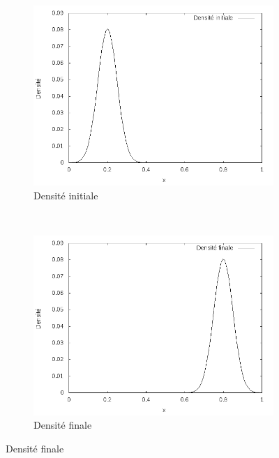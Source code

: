 \documentclass[a4paper,12pt]{article}
\begin{document}
\begin{figure}[!h]
\centering 
	\begin{subfigure}[b]{0.48\linewidth}
	\includegraphics[width=\textwidth]{img/1DGaussian100x100/f0.png}
	\caption{Densité initiale}
	\end{subfigure}
	~
	\begin{subfigure}[b]{0.48\linewidth}
	\includegraphics[width=\textwidth]{img/1DGaussian100x100/f1.png}
	\caption{Densité finale}
	\end{subfigure}
	

\end{figure}
\end{document}
